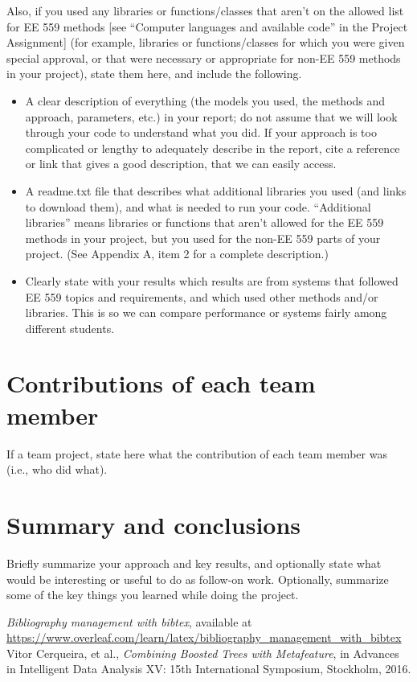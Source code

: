 \documentclass[singlecolumn]{article}
\begin{document}
Also, if you used any libraries or functions/classes that aren’t on the allowed list for EE 559 methods [see “Computer languages and available code” in the Project Assignment] (for example, libraries or functions/classes for which you were given special approval, or that were necessary or appropriate for non-EE 559 methods in your project), state them here, and include the following.

\begin{itemize}
	\item A clear description of everything (the models you used, the methods and approach, parameters, etc.) in your report; do not assume that we will look through your code to understand what you did. If your approach is too complicated or lengthy to adequately describe in the report, cite a reference or link that gives a good description, that we can easily access.  
	\item A readme.txt file that describes what additional libraries you used (and links to download them), and what is needed to run your code.  “Additional libraries” means libraries or functions that aren’t allowed for the EE 559 methods in your project, but you used for the non-EE 559 parts of your project.  (See Appendix A, item 2 for a complete description.)
	\item Clearly state with your results which results are from systems that followed EE 559 topics and requirements, and which used other methods and/or libraries. This is so we can compare performance or systems fairly among different students.
\end{itemize}


\section{Contributions of each team member}
If a team project, state here what the contribution of each team member was (i.e., who did what). 

\section{Summary and conclusions}
Briefly summarize your approach and key results, and optionally state what would be interesting or useful to do as follow-on work.  Optionally, summarize some of the key things you learned while doing the project.



\begin{thebibliography}{2}
	 \textit{Bibliography management with bibtex}, available at \url{https://www.overleaf.com/learn/latex/bibliography_management_with_bibtex}
	 Vitor Cerqueira, et al., \textit{Combining Boosted Trees with Metafeature}, in Advances in Intelligent Data Analysis XV: 15th International Symposium, Stockholm, 2016.
\end{thebibliography}
\end{document}
